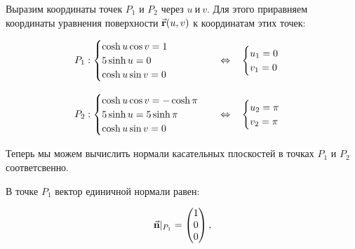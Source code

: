 \documentclass[12pt,a4paper]{article}
\begin{document}
    Выразим координаты точек $ P_1 $ и $ P_2 $ через $ u \ \text{и} \ v $. Для этого приравняем координаты уравнения поверхности $ \vec{\textbf r}(u, v) $ к координатам этих точек:

    \[
        \begin{tabular}{lcl}
            $
                P_1: 
                \begin{cases}
                    \cosh u \cos v = 1
                    \\
                    5 \sinh u = 0
                    \\
                    \cosh u \sin v = 0
                \end{cases} 
            $ 
            & $ \Leftrightarrow $ & 
            $
                \begin{cases}
                    u_1 = 0
                    \\
                    v_1 = 0
                \end{cases}
            $

            \\ \\

            $
                P_2: 
                \begin{cases}
                    \cosh u \cos v = -\cosh \pi
                    \\
                    5 \sinh u =  5 \sinh \pi
                    \\
                    \cosh u \sin v = 0
                \end{cases}
            $ 
            & $ \Leftrightarrow $ & 
            $
                \begin{cases}
                    u_2 = \pi
                    \\
                    v_2 = \pi
                \end{cases}
            $

        \end{tabular}
    \]

    Теперь мы можем вычислить нормали касательных плоскостей в точках $ P_1 $ и $ P_2 $ соответсвенно. 
    
    В точке $ {P_1} $ вектор единичной нормали равен:

    \[
        \vec{\textbf n}|_{P_1} =
        \begin{pmatrix}
            1 
            \\ 
            0 
            \\ 
            0  
        \end{pmatrix},
    \]
\end{document}
